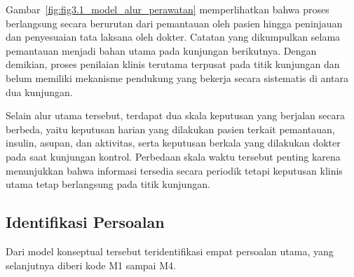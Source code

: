 Gambar~\ref{fig:fig3.1_model_alur_perawatan} memperlihatkan bahwa proses berlangsung secara berurutan dari pemantauan oleh pasien hingga peninjauan dan penyesuaian tata laksana 
oleh dokter. Catatan yang dikumpulkan selama pemantauan menjadi bahan utama pada kunjungan berikutnya. Dengan demikian, proses penilaian klinis terutama terpusat pada titik 
kunjungan dan belum memiliki mekanisme pendukung yang bekerja secara sistematis di antara dua kunjungan.

Selain alur utama tersebut, terdapat dua skala keputusan yang berjalan secara berbeda, yaitu keputusan harian yang dilakukan pasien terkait pemantauan, insulin, asupan, dan 
aktivitas, serta keputusan berkala yang dilakukan dokter pada saat kunjungan kontrol. Perbedaan skala waktu tersebut penting karena menunjukkan bahwa informasi tersedia secara 
periodik tetapi keputusan klinis utama tetap berlangsung pada titik kunjungan.

\subsection{Identifikasi Persoalan}
\label{subsec:bab3-identifikasi-persoalan}

Dari model konseptual tersebut teridentifikasi empat persoalan utama, yang selanjutnya diberi kode M1 sampai M4.

